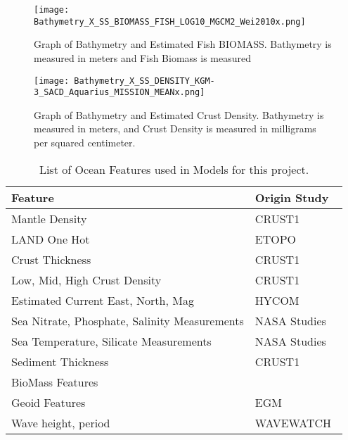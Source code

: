 \begin{figure}[htp]
    \centering
    \texttt{[image: Bathymetry\_X\_SS\_BIOMASS\_FISH\_LOG10\_MGCM2\_Wei2010x.png]}
    \caption{Graph of Bathymetry and Estimated Fish BIOMASS. Bathymetry is measured in meters and Fish Biomass is measured }
    \label{fig:bathyxfish}
\end{figure}

\begin{figure}[htp]
    \centering
    \texttt{[image: Bathymetry\_X\_SS\_DENSITY\_KGM-3\_SACD\_Aquarius\_MISSION\_MEANx.png]}
    \caption{Graph of Bathymetry and Estimated Crust Density.
    Bathymetry is measured in meters, and Crust Density is measured in milligrams per squared centimeter.}
    \label{fig:bathyxdensity}
\end{figure}

%

\newpage

\begin{table}[htp]
    \centering
    \caption{List of Ocean Features used in Models for this project.}
    \begin{tabular}{ |p{} p{}| }
        \hline
            \textbf{Feature} & \textbf{Origin Study} \\
            \hline
            Mantle Density & CRUST1~\cite{laske2013update} \\
            LAND One Hot & ETOPO~\cite{national1988etopo} \\
            Crust Thickness & CRUST1~\cite{laske2013update} \\
            Low, Mid, High Crust Density & CRUST1~\cite{laske2013update} \\
            Estimated Current East, North, Mag & HYCOM~\cite{chassignet2009us} \\
            Sea Nitrate, Phosphate, Salinity Measurements & NASA Studies~\cite{meissner2018salinity,parekh2005decoupling}  \\
            Sea Temperature, Silicate Measurements & NASA Studies \\
            Sediment Thickness & CRUST1~\cite{laske2013update} \\
            BioMass Features &~\cite{wei2010global} \\
            Geoid Features & EGM~\cite{pavlis2008earth} \\
            Wave height, period & WAVEWATCH~\cite{tolman20072007} \\
        \hline
    \end{tabular}
    \label{table:FEATURE_LIST}
\end{table}
